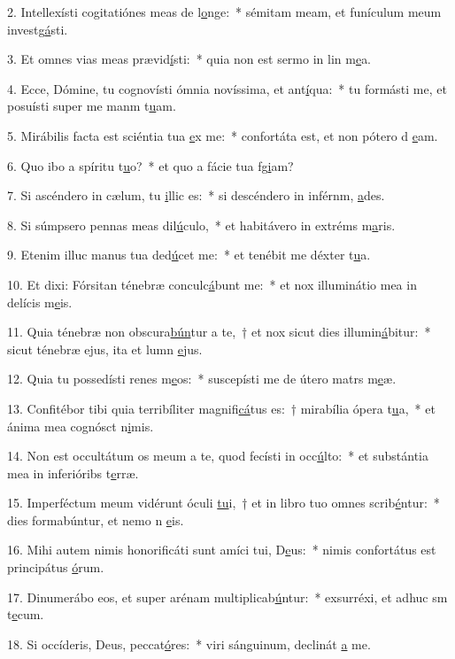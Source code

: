 2. Intellexísti cogitatiónes meas de l\uline{o}nge:~* sémitam meam, et funículum meum investg\uline{á}sti.\par 
3. Et omnes vias meas prævid\uline{í}sti:~* quia non est sermo in lin m\uline{e}a.\par 
4. Ecce, Dómine, tu cognovísti ómnia novíssima, et ant\uline{í}qua:~* tu formásti me, et posuísti super me manm t\uline{u}am.\par 
5. Mirábilis facta est sciéntia tua \uline{e}x me:~* confortáta est, et non pótero d \uline{e}am.\par 
6. Quo ibo a spíritu t\uline{u}o?~* et quo a fácie tua fg\uline{i}am?\par 
7. Si ascéndero in cælum, tu \uline{i}llic es:~* si descéndero in inférnm, \uline{a}des.\par 
8. Si súmpsero pennas meas dil\uline{ú}culo,~* et habitávero in extréms m\uline{a}ris.\par 
9. Etenim illuc manus tua ded\uline{ú}cet me:~* et tenébit me déxter t\uline{u}a.\par 
10. Et dixi: Fórsitan ténebræ conculc\uline{á}bunt me:~* et nox illuminátio mea in delícis m\uline{e}is.\par 
11. Quia ténebræ non obscura\uline{bún}tur a te,~† et nox sicut dies illumin\uline{á}bitur:~* sicut ténebræ ejus, ita et lumn \uline{e}jus.\par 
12. Quia tu possedísti renes m\uline{e}os:~* suscepísti me de útero matrs m\uline{e}æ.\par 
13. Confitébor tibi quia terribíliter magnifi\uline{cá}tus es:~† mirabília ópera t\uline{u}a,~* et ánima mea cognósct n\uline{i}mis.\par 
14. Non est occultátum os meum a te, quod fecísti in occ\uline{ú}lto:~* et substántia mea in inferióribs t\uline{e}rræ.\par 
15. Imperféctum meum vidérunt óculi \uline{tu}i,~† et in libro tuo omnes scrib\uline{é}ntur:~* dies formabúntur, et nemo n \uline{e}is.\par 
16. Mihi autem nimis honorificáti sunt amíci tui, D\uline{e}us:~* nimis confortátus est principátus \uline{ó}rum.\par 
17. Dinumerábo eos, et super arénam multiplicab\uline{ú}ntur:~* exsurréxi, et adhuc sm t\uline{e}cum.\par 
18. Si occíderis, Deus, peccat\uline{ó}res:~* viri sánguinum, declinát \uline{a} me.\par 
